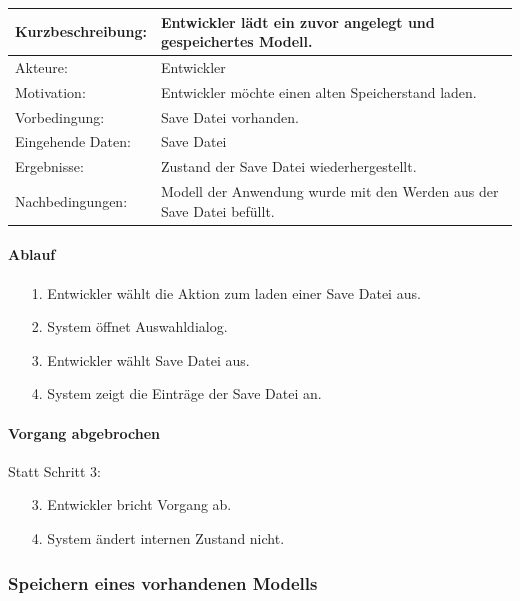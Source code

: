 \begin{tabular}[h]{|p{4cm}|p{}|}
\hline 
\rule[-1ex]{0pt}{2.5ex}Kurzbeschreibung: & 
Entwickler lädt ein zuvor angelegt und gespeichertes Modell. \\  
\hline 
\rule[-1ex]{0pt}{2.5ex}Akteure: & 
Entwickler \\ 
\hline 
\rule[-1ex]{0pt}{2.5ex}Motivation: & 
Entwickler möchte einen alten Speicherstand laden. \\ 
\hline 
\rule[-1ex]{0pt}{2.5ex}Vorbedingung: & 
Save Datei vorhanden. \\ 
\hline 
\rule[-1ex]{0pt}{2.5ex}Eingehende Daten: & Save Datei\\ 
\hline 
\rule[-1ex]{0pt}{2.5ex}Ergebnisse: & Zustand der Save Datei wiederhergestellt. \\ 
\hline 
\rule[-1ex]{0pt}{2.5ex}Nachbedingungen: & Modell der Anwendung wurde mit den Werden aus der Save Datei befüllt.  \\ 
\hline 
\end{tabular} 

\paragraph{Ablauf}

\begin{itemize}[itemsep=0pt]
\item[1.] Entwickler wählt die Aktion zum laden einer Save Datei aus.
\item[2.] System öffnet Auswahldialog. 
\item[3.] Entwickler wählt Save Datei aus.
\item[4.] System zeigt die Einträge der Save Datei an.
\end{itemize}

\paragraph{Vorgang abgebrochen}
Statt Schritt 3:
\begin{itemize}[itemsep=0pt]
\item[3.] Entwickler bricht Vorgang ab. 
\item[4.] System ändert internen Zustand nicht. 
\end{itemize}

\subsubsection{Speichern eines vorhandenen Modells}
\label{sec:save}

